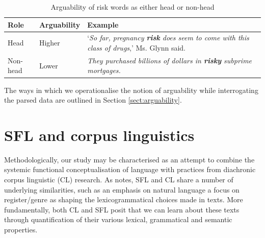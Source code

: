 \begin{table}
\centering
\footnotesize
\begin{tabularx}{.70\textwidth}{L{.50}L{.50}L{2}}%
\toprule
\textbf{Role}              & \textbf{Arguability} & \textbf{Example} \\ \midrule
Head           & Higher   & `\emph{So far, pregnancy \textbf{risk} does seem to come with this class of drugs},' Ms. Glynn said.       \\ 
Non-head   & Lower   & \emph{They purchased billions of dollars in \textbf{risky} subprime mortgages.}       \\ \bottomrule
\end{tabularx}
\caption{Arguability of risk words as either head or non-head}
\end{table}

The ways in which we operationalise the notion of arguability while interrogating the parsed data are outlined in Section \ref{sect:arguability}.





\section{SFL and corpus linguistics}

Methodologically, our study may be characterised as an attempt to combine the systemic functional conceptualisation of language with practices from diachronic corpus linguistic (CL) research. As  notes, SFL and CL share a number of underlying similarities, such as an emphasis on natural language a focus on register\slash genre as shaping the lexicogrammatical choices made in texts. More fundamentally, both CL and SFL posit that we can learn about these texts through quantification of their various lexical, grammatical and semantic properties. %

